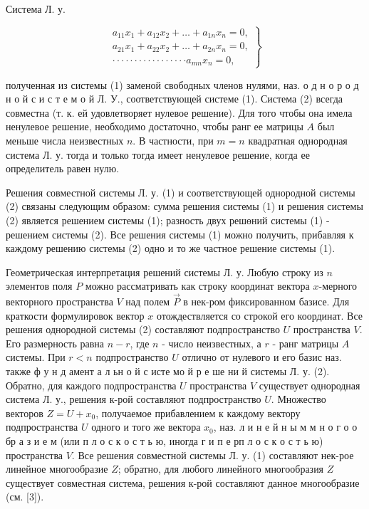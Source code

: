 \documentclass[10pt]{article}
\begin{document}
Система Л. у.



\[

\left.\begin{array}{c}

a_{11} x_{1}+a_{12} x_{2}+\ldots+a_{1 n} x_{n}=0, \\

a_{21} x_{1}+a_{22} x_{2}+\ldots+a_{2 n} x_{n}=0, \\

\cdot \cdot \cdot \cdot \cdot \cdot \cdot \cdot \cdot \cdot \cdot \cdot \cdot \cdot \cdot \cdot \cdot a_{m n} x_{n}=0,

\end{array}\right\}

\]



полученная из системы (1) заменой свободных членов нулями, наз. о д н о р о д н о й с и с т е м о й Л. У., соответствующей системе (1). Система (2) всегда совместна (т. к. ей удовлетворяет нулевое решение). Для того чтобы она имела ненулевое решение, необходимо достаточно, чтобы ранг ее матрицы $A$ был меньше числа неизвестных $n$. В частности, при $m=n$ квадратная однородная система Л. у. тогда и только тогда имеет ненулевое решение, когда ее определитель равен нулю.



Решения совместной системы Л. у. (1) и соответствующей однородной системы (2) связаны следующим образом: сумма решения системы (1) и решения системы (2) является решением системы (1); разность двух решөний системы (1) - решением системы (2). Все решения системы (1) можно получить, прибавляя к каждому решению системы (2) одно и то же частное решение системы (1).



Геометрическая интерпретация решений системы Л. у. Любую строку из $n$ элементов поля $P$ можно рассматривать как строку координат вектора $x$-мерного векторного пространства $V$ над полем $\vec{P}$ в нек-ром фиксированном базисе. Для краткости формулировок вектор $x$ отождествляется со строкой его координат. Все решения однородной системы (2) составляют подпространство $U$ пространства $V$. Его размерность равна $n-r$, где $n$ - число неизвестных, а $r$ - ранг матрицы $A$ системы. При $r<n$ подпространство $U$ отлично от нулевого и его базис наз. также ф у н д амент а л ьн о й с исте мо й р е ше ни й системы Л. у. (2). Обратно, для каждого подпространства $U$ пространства $V$ существует однородная система Л. у., решения к-рой составляют подпространство $U$. Множество векторов $Z=U+x_{0}$, получаемое прибавлением к каждому вектору подпространства $U$ одного и того же вектора $x_{0}$, наз. л и н е й н ы м м н о г о о бр а з и е м (или п л о с к о с т ь ю, иногда г и п е рп л о с к о с т ь ю) пространства $V$. Все решения совместной системы Л. у. (1) составляют нек-рое линейное многообразие $Z$; обратно, для любого линейного многообразия $Z$ существует совместная система, решения к-рой составляют данное многообразие (см. [3]).
\end{document}
